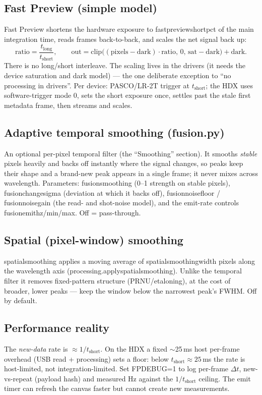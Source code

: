 \documentclass[12pt,a4paper]{article}
\DeclareRobustCommand{\code}[1]{{\ttfamily\small\def\_{\rawus\allowbreak}#1}}
\DeclareRobustCommand{\file}[1]{{\ttfamily\small\def\_{\rawus\allowbreak}#1}}
\DeclareRobustCommand{\key}[1]{{\ttfamily\small\color{acc2}\def\_{\rawus\allowbreak}#1}}
\begin{document}
\subsection{Fast Preview (simple model)}\label{sec:fp}
Fast Preview shortens the hardware exposure to \key{fast\_preview\_short\_pct} of
the main integration time, reads frames back-to-back, and scales the net signal
back up:
\[
\text{ratio} = \frac{t_{\text{long}}}{t_{\text{short}}}, \qquad
\text{out} = \mathrm{clip}\big((\text{pixels}-\text{dark})\cdot\text{ratio},\,0,\,
\text{sat}-\text{dark}\big) + \text{dark}.
\]
There is no long/short interleave. The scaling lives in the drivers (it needs the
device saturation and dark model) --- the one deliberate exception to ``no
processing in drivers''. Per device: PASCO/LR-2T trigger at $t_{\text{short}}$; the
HDX uses software-trigger mode 0, sets the short exposure once, settles past the
stale first metadata frame, then streams and scales.

\subsection{Adaptive temporal smoothing (\file{fusion.py})}
An optional per-pixel temporal filter (the ``Smoothing'' section). It smooths
\emph{stable} pixels heavily and backs off instantly where the signal changes, so
peaks keep their shape and a brand-new peak appears in a single frame; it never
mixes across wavelength. Parameters: \key{fusion\_smoothing} (0--1 strength on
stable pixels), \key{fusion\_change\_sigma} (deviation at which it backs off),
\key{fusion\_noise\_floor} / \key{fusion\_noise\_gain} (the read- and shot-noise
model), and the emit-rate controls \key{fusion\_emit\_hz/min/max}. Off =
pass-through.

\subsection{Spatial (pixel-window) smoothing}
\key{spatial\_smoothing} applies a moving average of \key{spatial\_smoothing\_width}
pixels along the wavelength axis (\code{processing.apply\_spatial\_smoothing}).
Unlike the temporal filter it removes fixed-pattern structure (PRNU/etaloning), at
the cost of broader, lower peaks --- keep the window below the narrowest peak's
FWHM. Off by default.

\subsection{Performance reality}\label{sec:perf}
The \emph{new-data} rate is $\approx 1/t_{\text{short}}$. On the HDX a fixed
$\sim$25\,ms host per-frame overhead (USB read + processing) sets a floor: below
$t_{\text{short}}\approx 25\,$ms the rate is host-limited, not integration-limited.
Set \code{FP\_DEBUG=1} to log per-frame $\Delta t$, new-vs-repeat (payload hash) and
measured Hz against the $1/t_{\text{short}}$ ceiling. The emit timer can refresh the
canvas faster but cannot create new measurements.
\end{document}

